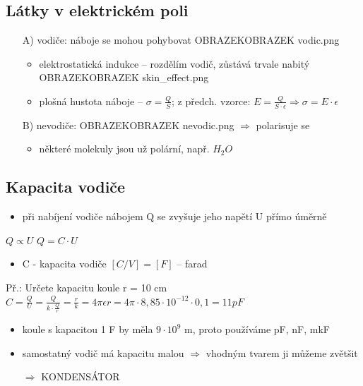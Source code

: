 \documentclass{article}
\begin{document}
\subsection{Látky v elektrickém poli}
\begin{itemize}
  \item[A)] vodiče: náboje se mohou pohybovat OBRAZEKOBRAZEK vodic.png
  \begin{itemize}
    \item elektrostatická indukce -- rozdělím vodič, zůstává trvale nabitý OBRAZEKOBRAZEK skin\_effect.png
    \item plošná hustota náboje -- $\sigma = \frac{Q}{S}$; z předch. vzorce: $E = \frac{Q}{S\cdot \epsilon} \Rightarrow \sigma = E\cdot \epsilon$
  \end{itemize}
  \item[B)] nevodiče: OBRAZEKOBRAZEK nevodic.png $\Rightarrow$ polarisuje se
  \begin{itemize}
    \item některé molekuly jsou už  polární, např. $H_2 O$
  \end{itemize}
\end{itemize}
\subsection{Kapacita vodiče}
\begin{itemize}
  \item při nabíjení vodiče nábojem Q se zvyšuje jeho napětí U přímo úměrně
\end{itemize}
  $Q \propto U$
  $Q = C \cdot U$
\begin{itemize}
  \item C - kapacita vodiče $[C/V] = [F]$ -- farad
\end{itemize}
Př.: Určete kapacitu koule r = 10 cm
$C = \frac{Q}{U} = \frac{Q}{k\cdot \frac{Q}{r}} = \frac{r}{k} = 4\pi \epsilon r = 4\pi\cdot8,85\cdot10^{-12}\cdot0,1 = 11 pF$
\begin{itemize}
  \item koule s kapacitou 1 F by měla $9\cdot 10^{9}$ m, proto používáme pF, nF, mkF
  \item samostatný vodič má kapacitu malou $\Rightarrow$ vhodným tvarem ji můžeme zvětšit
  \item[ $\Rightarrow$ ] KONDENSÁTOR
\end{itemize}
\end{document}
